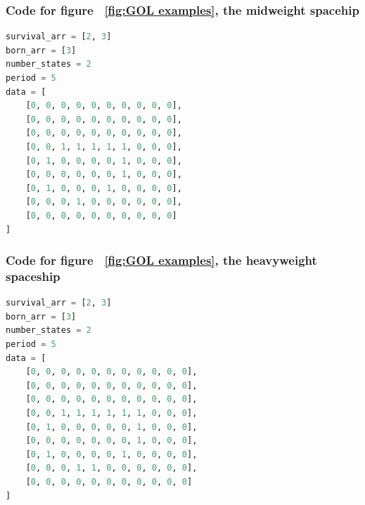 \documentclass[12pt]{article}
\numberwithin{figure}{section} %
\begin{document}
\subsubsection{Code for figure ~\ref{fig:GOL examples}, the midweight spacehip}
\label{subsubsection:midweight spaceship}
\begin{lstlisting}[language = Python]
survival_arr = [2, 3]
born_arr = [3]
number_states = 2
period = 5
data = [
    [0, 0, 0, 0, 0, 0, 0, 0, 0, 0],
    [0, 0, 0, 0, 0, 0, 0, 0, 0, 0],
    [0, 0, 0, 0, 0, 0, 0, 0, 0, 0],
    [0, 0, 1, 1, 1, 1, 1, 0, 0, 0],
    [0, 1, 0, 0, 0, 0, 1, 0, 0, 0],
    [0, 0, 0, 0, 0, 0, 1, 0, 0, 0],
    [0, 1, 0, 0, 0, 1, 0, 0, 0, 0],
    [0, 0, 0, 1, 0, 0, 0, 0, 0, 0],
    [0, 0, 0, 0, 0, 0, 0, 0, 0, 0]
]
\end{lstlisting}

\subsubsection{Code for figure ~\ref{fig:GOL examples}, the heavyweight spaceship}
\label{subsubsection:heavyweight spaceship}
\begin{lstlisting}[language = Python]
survival_arr = [2, 3]
born_arr = [3]
number_states = 2
period = 5
data = [
    [0, 0, 0, 0, 0, 0, 0, 0, 0, 0, 0],
    [0, 0, 0, 0, 0, 0, 0, 0, 0, 0, 0],
    [0, 0, 0, 0, 0, 0, 0, 0, 0, 0, 0],
    [0, 0, 1, 1, 1, 1, 1, 1, 0, 0, 0],
    [0, 1, 0, 0, 0, 0, 0, 1, 0, 0, 0],
    [0, 0, 0, 0, 0, 0, 0, 1, 0, 0, 0],
    [0, 1, 0, 0, 0, 0, 1, 0, 0, 0, 0],
    [0, 0, 0, 1, 1, 0, 0, 0, 0, 0, 0],
    [0, 0, 0, 0, 0, 0, 0, 0, 0, 0, 0]
]
\end{lstlisting}
\end{document}
